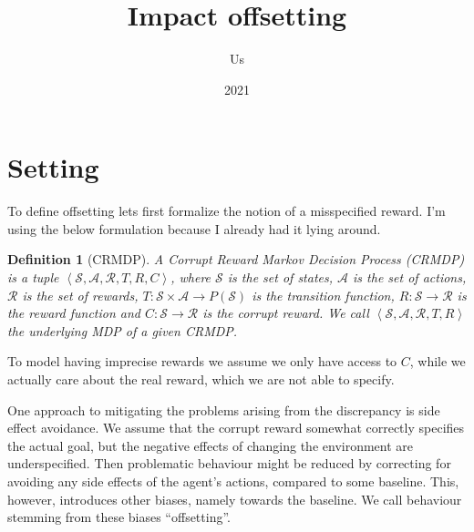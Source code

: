 \documentclass{article}
\title{Impact offsetting}
\author{Us}
\date{2021}
\newtheorem{definition}{Definition}
\newcommand{\stateSpace}{\mathcal{S}}
\newcommand{\actionSpace}{\mathcal{A}}
\newcommand{\rewardSpace}{\mathcal{R}}
\newcommand{\trasitionFunction}{T}
\newcommand{\rewardFunction}{R}
\newcommand{\corruption}{C}
\newcommand{\tuple}[1]{\left\langle #1 \right\rangle}
\newcommand{\rawMDP}{\stateSpace, \actionSpace, \rewardSpace, \trasitionFunction, \rewardFunction}
\newcommand{\MDP}{\tuple{\rawMDP}}
\newcommand{\rawCRMDP}{\rawMDP, \corruption}
\newcommand{\CRMDP}{\tuple{\rawCRMDP}}
\begin{document}
\maketitle

\section{Setting}

 To define offsetting lets first formalize the notion of a misspecified reward. I'm using the below formulation because I already had it lying around.

	\begin{definition}[CRMDP]
		A \emph{Corrupt Reward Markov Decision Process} (CRMDP) is a tuple $\CRMDP$, where $\stateSpace$ is the set of states,
		$\actionSpace$ is the set of actions, $\rewardSpace$ is the set of rewards, $\trasitionFunction \colon \stateSpace \times \actionSpace \to P\left( \stateSpace \right)$
		is the transition function, $\rewardFunction \colon \stateSpace \to \rewardSpace$ is the reward function and $\corruption \colon \stateSpace \to \rewardSpace$ is the corrupt
		reward. We call $\MDP$ the \emph{underlying MDP} of a given CRMDP.
		\label{def:CRMDP}
	\end{definition}

	To model having imprecise rewards we assume we only have access to $\corruption$, while we actually care about the real reward, which we are not able to specify.

	One approach to mitigating the problems arising from the discrepancy is side effect avoidance. We assume that the corrupt reward somewhat correctly specifies the actual goal,
	but the negative effects of changing the environment are underspecified. Then problematic behaviour might be reduced by correcting for avoiding any side effects of the agent's
	actions, compared to some baseline. This, however, introduces other biases, namely towards the baseline. We call behaviour stemming from these biases ``offsetting''.
\end{document}
